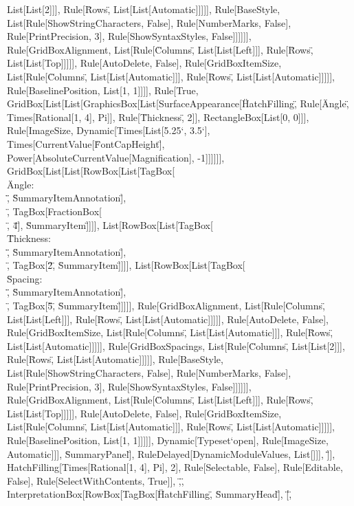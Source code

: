 \documentclass{article}
\begin{document}
{{{{List[List[2]]], Rule[\"Rows\", List[List[Automatic]]]]], Rule[BaseStyle, List[Rule[ShowStringCharacters, False], Rule[NumberMarks, False], Rule[PrintPrecision,
3], Rule[ShowSyntaxStyles, False]]]]]], Rule[GridBoxAlignment, List[Rule[\"Columns\", List[List[Left]]], Rule[\"Rows\", List[List[Top]]]]], Rule[AutoDelete,
False], Rule[GridBoxItemSize, List[Rule[\"Columns\", List[List[Automatic]]], Rule[\"Rows\", List[List[Automatic]]]]], Rule[BaselinePosition, List[1,
1]]]], Rule[True, GridBox[List[List[GraphicsBox[List[SurfaceAppearance[\"HatchFilling\", Rule[\"Angle\", Times[Rational[1, 4], Pi]], Rule[\"Thickness\",
2]], RectangleBox[List[0, 0]]], Rule[ImageSize, Dynamic[Times[List[5.25`, 3.5`], Times[CurrentValue[\"FontCapHeight\"], Power[AbsoluteCurrentValue[Magnification],
-1]]]]]], GridBox[List[List[RowBox[List[TagBox[\"\\\"Angle: \\\"\", \"SummaryItemAnnotation\"], \"\\[InvisibleSpace]\", TagBox[FractionBox[\"\\[Pi]\",
\"4\"], \"SummaryItem\"]]]], List[RowBox[List[TagBox[\"\\\"Thickness: \\\"\", \"SummaryItemAnnotation\"], \"\\[InvisibleSpace]\", TagBox[\"2\", \"SummaryItem\"]]]],
List[RowBox[List[TagBox[\"\\\"Spacing: \\\"\", \"SummaryItemAnnotation\"], \"\\[InvisibleSpace]\", TagBox[\"5\", \"SummaryItem\"]]]]], Rule[GridBoxAlignment,
List[Rule[\"Columns\", List[List[Left]]], Rule[\"Rows\", List[List[Automatic]]]]], Rule[AutoDelete, False], Rule[GridBoxItemSize, List[Rule[\"Columns\",
List[List[Automatic]]], Rule[\"Rows\", List[List[Automatic]]]]], Rule[GridBoxSpacings, List[Rule[\"Columns\", List[List[2]]], Rule[\"Rows\", List[List[Automatic]]]]],
Rule[BaseStyle, List[Rule[ShowStringCharacters, False], Rule[NumberMarks, False], Rule[PrintPrecision, 3], Rule[ShowSyntaxStyles, False]]]]]], Rule[GridBoxAlignment,
List[Rule[\"Columns\", List[List[Left]]], Rule[\"Rows\", List[List[Top]]]]], Rule[AutoDelete, False], Rule[GridBoxItemSize, List[Rule[\"Columns\",
List[List[Automatic]]], Rule[\"Rows\", List[List[Automatic]]]]], Rule[BaselinePosition, List[1, 1]]]]], Dynamic[Typeset`open$$], Rule[ImageSize,
Automatic]]], \"SummaryPanel\"], RuleDelayed[DynamicModuleValues, List[]]], \"]\"}], HatchFilling[Times[Rational[1, 4], Pi], 2], Rule[Selectable,
False], Rule[Editable, False], Rule[SelectWithContents, True]], \",\", InterpretationBox[RowBox[{TagBox[\"HatchFilling\", \"SummaryHead\"], \"[\",
}}}}
\end{document}

